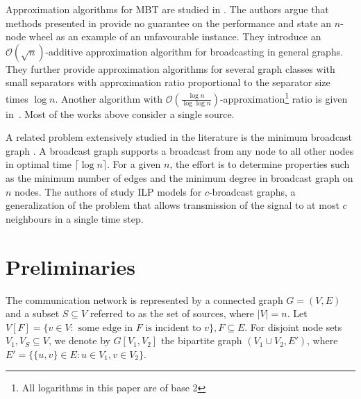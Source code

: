 Approximation algorithms for MBT are studied in \cite{kortsarz95}. 
The authors argue that methods presented in \cite{scheuermann84} provide no guarantee on the performance and state an $n$-node wheel as an example of an unfavourable instance.
They introduce an $\mathcal{O}(\sqrt{n})$-additive approximation algorithm for broadcasting in general graphs.
They further provide approximation algorithms for several graph classes with small separators with approximation ratio proportional to the separator size times $\log n$.
Another algorithm with $\mathcal{O}\left(\frac{\log n}{\log \log n}\right)$-approximation\footnote{All logarithms in this paper are of base 2} ratio is given in~\cite{elkin03}.
Most of the works above consider a single source.

A related problem extensively studied in the literature is the minimum broadcast graph \cite{grigni91,mcgarvey16}. 
A broadcast graph supports a broadcast from any node to all other nodes in optimal time $\lceil\log n\rceil$.
For a given $n$, the effort is to determine properties such as the minimum number of edges and the minimum degree in broadcast graph on $n$ nodes.
The authors of \cite{mcgarvey16} study ILP models for $c$-broadcast graphs, a generalization of the problem that allows transmission of the signal to at most $c$ neighbours in a single time step.

\section{Preliminaries}

The communication network is represented by a connected graph $G=(V,E)$ and a subset $S\subseteq V$ referred to as the set of sources, where $|V|=n$. 
Let $V\left[F\right]=\{v\in V:\text{ some edge in } F \text{ is incident to } v\}, F\subseteq E$.
For disjoint node sets $V_1,V_S\subseteq V$, we denote by $G\left[V_1,V_2\right]$ the bipartite graph $(V_1\cup V_2,E')$, where  $E'=\{\{u,v\}\in E: u\in V_1,v\in V_2\}$. 

